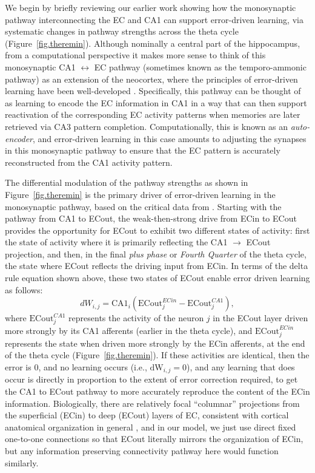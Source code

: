 \documentclass[11pt,twoside]{article}
\newif\myifpdf
\begin{document}
We begin by briefly reviewing our earlier work showing how the monosynaptic pathway interconnecting the EC and CA1 can support error-driven learning, via systematic changes in pathway strengths across the theta cycle \citep{KetzMorkondaOReilly13,HasselmoBodelonWyble02,SiegleWilson14} (Figure~\ref{fig.theremin}).  Although nominally a central part of the hippocampus, from a computational perspective it makes more sense to think of this monosynaptic CA1 $\leftrightarrow$ EC pathway (sometimes known as the temporo-ammonic pathway) as an extension of the neocortex, where the principles of error-driven learning have been well-developed \citep{OReilly96,WhittingtonBogacz19,LillicrapSantoroMarrisEtAl20}.  Specifically, this pathway can be thought of as learning to encode the EC information in CA1 in a way that can then support reactivation of the corresponding EC activity patterns when memories are later retrieved via CA3 pattern completion.  Computationally, this is known as an \emph{auto-encoder}, and error-driven learning in this case amounts to adjusting the synapses in this monosynaptic pathway to ensure that the EC pattern is accurately reconstructed from the CA1 activity pattern.

The differential modulation of the pathway strengths as shown in Figure~\ref{fig.theremin} is the primary driver of error-driven learning in the monosynaptic pathway, based on the critical data from \citet{HasselmoBodelonWyble02}.  Starting with the pathway from CA1 to ECout, the weak-then-strong drive from ECin to ECout provides the opportunity for ECout to exhibit two different states of activity: first the state of activity where it is primarily reflecting the CA1 $\rightarrow$ ECout projection, and then, in the final \emph{plus phase} or \emph{Fourth Quarter} of the theta cycle, the state where ECout reflects the driving input from ECin.  In terms of the delta rule equation shown above, these two states of ECout enable error driven learning as follows:
\begin{equation}
\label{eq.ECoutEDL}
    dW_{i,j} = \mbox{CA1}_i ( \mbox{ECout}_j^{ECin} - \mbox{ECout}_j^{CA1} ) ,
\end{equation}
where $\mbox{ECout}_j^{CA1}$ represents the activity of the neuron $j$ in the ECout layer driven more strongly by its CA1 afferents (earlier in the theta cycle), and $\mbox{ECout}_j^{ECin}$ represents the state when driven more strongly by the ECin afferents, at the end of the theta cycle (Figure~\ref{fig.theremin}).  If these activities are identical, then the error is 0, and no learning occurs (i.e., $\mbox{dW}_{i,j} = 0$), and any learning that does occur is directly in proportion to the extent of error correction required, to get the CA1 to ECout pathway to more accurately reproduce the content of the ECin information.  Biologically, there are relatively focal ``columnar'' projections from the superficial (ECin) to deep (ECout) layers of EC, consistent with cortical anatomical organization in general \citep{SurmeliMarcuMcClureEtAl15,WitterDoanJacobsenEtAl17,GerleiBrownSurmeliEtAl21}, and in our model, we just use direct fixed one-to-one connections so that ECout literally mirrors the organization of ECin, but any information preserving connectivity pathway here would function similarly.
\end{document}
